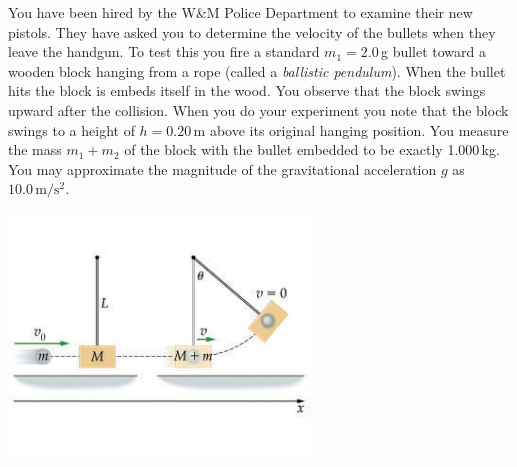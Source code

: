 \documentclass[letterpaper,addpoints,answers]{exam}
\begin{document}
\begin{questions}
\pagebreak


\begin{question}
You have been hired by the W\&M Police Department to examine their new pistols. They have asked you to determine the velocity of the bullets when they leave the handgun. To test this you fire a standard $m_1 = 2.0$\,g bullet toward a wooden block hanging from a rope (called a \emph{ballistic pendulum}). When the bullet hits the block is embeds itself in the wood. You observe that the block swings upward after the collision. When you do your experiment you note that the block swings to a height of $h = 0.20$\,m above its original hanging position. You measure the mass $m_1 + m_2$ of the block with the bullet embedded to be exactly 1.000\,kg. You may approximate the magnitude of the gravitational acceleration $g$ as $10.0\,\mbox{m}/\mbox{s}^2$.
\begin{center}
 \includegraphics[width=0.6\textwidth]{test2/ballistic_pendulum}
\end{center}

\end{question}
\end{questions}
\end{document}
